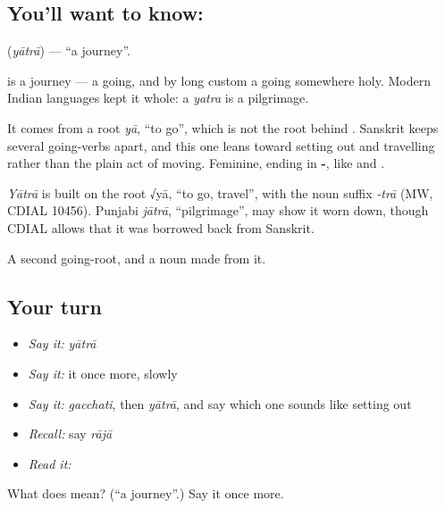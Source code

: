 \subsection*{You'll want to know: }
\textbf{} (\emph{yātrā}) — \textquotedblleft{}a journey\textquotedblright{}.

\textbf{} is a journey — a going, and by long custom a going somewhere holy. Modern Indian languages kept it whole: a \emph{yatra} is a pilgrimage.

It comes from a root \emph{yā}, \textquotedblleft{}to go\textquotedblright{}, which is not the root behind . Sanskrit keeps several going-verbs apart, and this one leans toward setting out and travelling rather than the plain act of moving. Feminine, ending in \textbf{-}, like  and .

\begin{cousinweb}
\emph{Yātrā} is built on the root √yā, \textquotedblleft{}to go, travel\textquotedblright{}, with the noun suffix \emph{-trā} (MW, CDIAL 10456). Punjabi \emph{jātrā}, \textquotedblleft{}pilgrimage\textquotedblright{}, may show it worn down, though CDIAL allows that it was borrowed back from Sanskrit.
\end{cousinweb}

\begin{grammarlens}[title={What you've built}]
A second going-root, and a noun made from it.
\end{grammarlens}

\subsection*{Your turn}
\begin{itemize}
\raggedright
  \item \emph{Say it:} \emph{yātrā}
  \item \emph{Say it:} it once more, slowly
  \item \emph{Say it:} \emph{gacchati}, then \emph{yātrā}, and say which one sounds like setting out
  \item \emph{Recall:} say \emph{rājā}
  \item \emph{Read it:} \textbf{}
\end{itemize}

\begin{tcolorbox}[breakable,colback=teal!4,colframe=teal!35!black,title={Before you move on}]
What does  mean? (\textquotedblleft{}a journey\textquotedblright{}.) Say it once more.
\end{tcolorbox}

